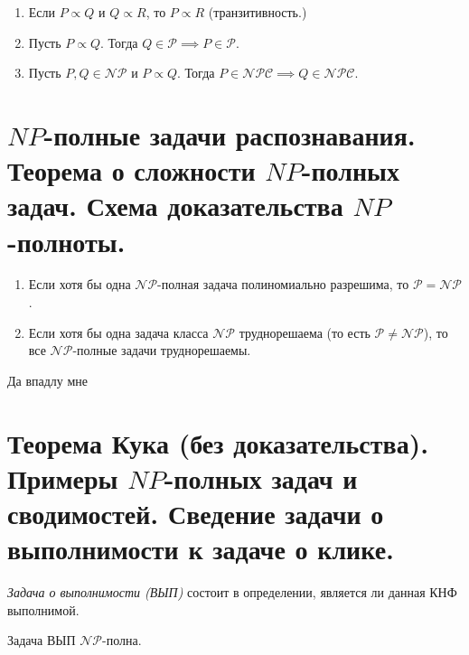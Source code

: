 \begin{theorem}\leavevmode
    \begin{enumerate}
        \item Если $ P \propto Q $ и $ Q \propto R $, то $ P \propto R $ (транзитивность.)
        \item Пусть $ P \propto Q $. Тогда $ Q \in \mathcal{P} \implies P \in \mathcal{P} $.
        \item Пусть $ P,Q \in \mathcal{NP} $ и $ P \propto Q $. Тогда $ P \in \mathcal{NPC} \implies Q \in \mathcal{NPC} $.
    \end{enumerate}
\end{theorem}

\section{$NP$-полные задачи распознавания. Теорема о сложности $NP$-полных задач. Схема доказательства $NP$-полноты.}

\begin{theorem}\leavevmode
    \begin{enumerate}
        \item Если хотя бы одна $ \mathcal{NP} $-полная задача полиномиально разрешима, то $ \mathcal{P} = \mathcal{NP} $.
        \item Если хотя бы одна задача класса $ \mathcal{NP} $ труднорешаема (то есть $ \mathcal{P} \ne \mathcal{NP} $), то все $ \mathcal{NP} $-полные задачи труднорешаемы.
    \end{enumerate}
\end{theorem}

\begin{note}
    Да впадлу мне
\end{note}

\section{Теорема Кука (без доказательства). Примеры $NP$-полных задач и сводимостей. Сведение задачи о выполнимости к задаче о клике.}

\begin{note}
    \emph{Задача о выполнимости (ВЫП)} состоит в определении, является ли данная КНФ выполнимой.
\end{note}

\begin{theorem}[Кука]
    Задача ВЫП $ \mathcal{NP} $-полна.
\end{theorem}

